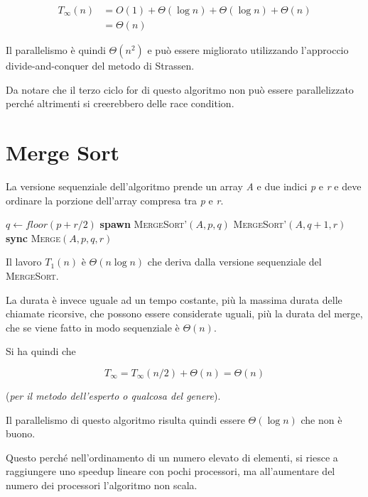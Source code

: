 \begin{align*}
	T_\infty(n) &= O(1) + \Theta(\log n) + \Theta(\log n) + \Theta(n) \\
		&= \Theta(n)
\end{align*}

Il parallelismo è quindi $\Theta(n^2)$ e può essere migliorato utilizzando l'approccio divide-and-conquer del metodo di Strassen.

Da notare che il terzo ciclo for di questo algoritmo non può essere parallelizzato perché altrimenti si creerebbero delle race condition.

\section{Merge Sort}\label{merge-sort}

La versione sequenziale dell'algoritmo prende un array \emph{A} e due indici \emph{p} e \emph{r} e deve ordinare la porzione dell'array compresa tra \emph{p} e \emph{r}.

\begin{breakablealgorithm}
	\begin{algorithmic}[1]
    \State $q \gets floor(p+r/2)$
    \State \textbf{spawn } \textsc{MergeSort'}$(A,p,q)$
    \State \textsc{MergeSort'}$(A,q+1,r)$
    \State \textbf{sync}
    \State \textsc{Merge}$(A,p,q,r)$
\EndIf
\EndFunction
	\end{algorithmic}
\end{breakablealgorithm}

Il lavoro $T_1(n)$ è $\Theta(n \log n)$ che deriva dalla versione sequenziale del \textsc{MergeSort}.

La durata è invece uguale ad un tempo costante, più la massima durata delle chiamate ricorsive, che possono essere considerate uguali, più la durata del merge, che se viene fatto in modo sequenziale è $\Theta(n)$. 

Si ha quindi che 

$$T_\infty = T_\infty(n/2) + \Theta(n) = \Theta(n)$$ 

(\emph{per il metodo dell'esperto o qualcosa del genere}).

Il parallelismo di questo algoritmo risulta quindi essere $\Theta(\log n)$ che non è buono.

Questo perché nell'ordinamento di un numero elevato di elementi, si riesce a raggiungere uno speedup lineare con pochi processori, ma all'aumentare del numero dei processori l'algoritmo non scala.

